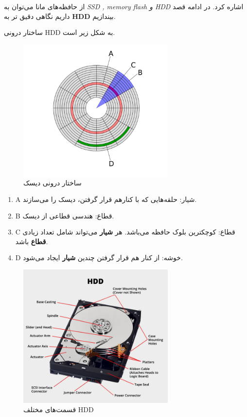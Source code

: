 \begin{flushright}
    از حافظه‌های مانا می‌توان به \emph{SSD , memory flash و HDD } اشاره کرد.
    در ادامه قصد داریم نگاهی دقیق تر به \textbf{HDD} بیندازیم.

    ساختار درونی HDD به شکل زیر است.
    \begin{figure}[H]
        \centering
        \includegraphics[width=0.7\textwidth]{source/HDD}
        \caption{ساختار درونی دیسک}
        \label{fig:HDD}
    \end{figure}

    \begin{small}
        \begin{enumerate}
            \item[] A شیار: حلقه‌هایی که با کنارهم قرار گرفتن، دیسک را می‌سازند.
            \item[] B قطاع: هندسی قطاعی از دیسک.
            \item[] C قطاع: کوچکترین بلوک حافظه می‌باشد.
            هر \textbf{شیار} می‌تواند شامل تعداد زیادی \textbf{قطاع} باشد.
            \item[] D خوشه: از کنار هم قرار گرفتن چندین \textbf{شیار} ایجاد می‌شود.
        \end{enumerate}
    \end{small}

    \begin{figure}[H]
        \centering
        \includegraphics[width=0.7\textwidth]{source/hdd-structure}
        \caption{قسمت‌های مختلف HDD}
        \label{fig:hdd-structure}
    \end{figure}


\end{flushright}
